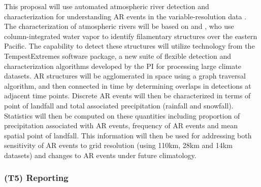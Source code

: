 \documentclass[11pt]{article}
\begin{document}
This proposal will use automated atmospheric river detection and characterization for understanding AR events in the variable-resolution data \citep{ralph2004satellite, lavers2012detection}.  The characterization of atmospheric rivers will be based on \cite{neiman2008meteorological} and \cite{guan2010extreme}, who use column-integrated water vapor to identify filamentary structures over the eastern Pacific.  The capability to detect these structures will utilize technology from the TempestExtremes software package, a new suite of flexible detection and characterization algorithms developed by the PI for processing large climate datasets.  AR structures will be agglomerated in space using a graph traversal algorithm, and then connected in time by determining overlaps in detections at adjacent time points.  Discrete AR events will then be characterized in terms of point of landfall and total associated precipitation (rainfall and snowfall).  Statistics will then be computed on these quantities including proportion of precipitation associated with AR events, frequency of AR events and mean spatial point of landfall.  This information will then be used for addressing both sensitivity of AR events to grid resolution (using 110km, 28km and 14km datasets) and changes to AR events under future climatology.



\subsubsection{(T5) Reporting}
\end{document}
